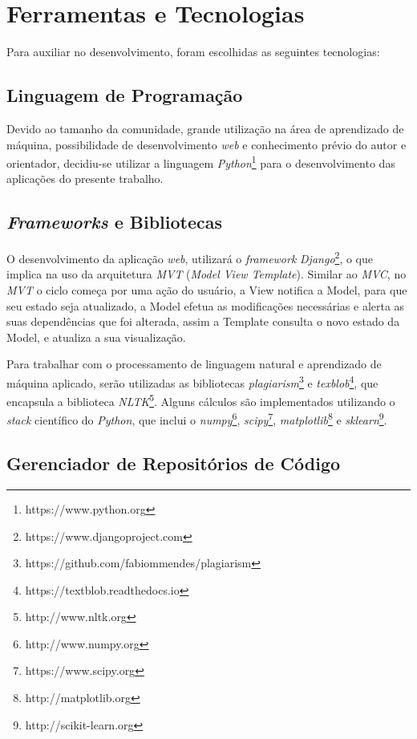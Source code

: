 \section{Ferramentas e Tecnologias}
\label{ferramentas}

Para auxiliar no desenvolvimento, foram escolhidas as seguintes tecnologias:

\subsection{Linguagem de Programação}

Devido ao tamanho da comunidade, grande utilização na área de aprendizado de máquina, possibilidade de desenvolvimento \textit{web} e conhecimento prévio do autor e orientador, decidiu-se utilizar a linguagem \textit{Python}\footnote{https://www.python.org} para o desenvolvimento das aplicações do presente trabalho.


\subsection{\textit{Frameworks} e Bibliotecas}

O desenvolvimento da aplicação \textit{web}, utilizará o \textit{framework} \textit{Django}\footnote{https://www.djangoproject.com}, o que implica na uso da arquitetura \textit{MVT} (\textit{Model View Template}). Similar ao \textit{MVC}, no \textit{MVT} o ciclo começa por uma ação do usuário, a View notifica a Model, para que seu estado seja atualizado, a Model efetua as modificações necessárias e alerta as suas dependências que foi alterada, assim a Template consulta o novo estado da Model, e atualiza a sua visualização.

Para trabalhar com o processamento de linguagem natural e aprendizado de máquina aplicado, serão utilizadas as bibliotecas \textit{plagiarism}\footnote{https://github.com/fabiommendes/plagiarism} e \textit{texblob}\footnote{https://textblob.readthedocs.io}, que encapsula a biblioteca \textit{NLTK}\footnote{http://www.nltk.org}. Alguns cálculos são implementados utilizando o \textit{stack} científico do \textit{Python}, que inclui o \textit{numpy}\footnote{http://www.numpy.org}, \textit{scipy}\footnote{https://www.scipy.org}, \textit{matplotlib}\footnote{http://matplotlib.org} e \textit{sklearn}\footnote{http://scikit-learn.org}.


\subsection{Gerenciador de Repositórios de Código}


